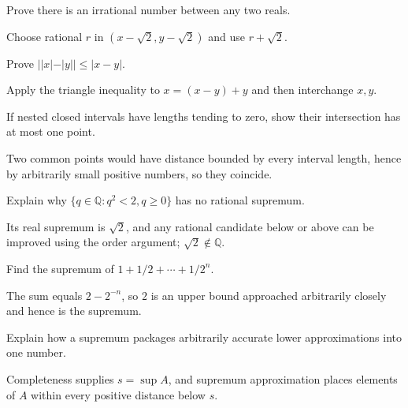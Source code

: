\begin{problem}\label{prob:ii01-problem-07}
Prove there is an irrational number between any two reals.
\end{problem}
\begin{solution}
Choose rational $r$ in $(x-\sqrt2,y-\sqrt2)$ and use $r+\sqrt2$.
\end{solution}

\begin{problem}\label{prob:ii01-problem-08}
Prove $||x|-|y||\le|x-y|$.
\end{problem}
\begin{solution}
Apply the triangle inequality to $x=(x-y)+y$ and then interchange $x,y$.
\end{solution}

\begin{problem}\label{prob:ii01-problem-09}
If nested closed intervals have lengths tending to zero, show their intersection has at most one point.
\end{problem}
\begin{solution}
Two common points would have distance bounded by every interval length, hence by arbitrarily small positive numbers, so they coincide.
\end{solution}

\begin{problem}\label{prob:ii01-problem-10}
Explain why $\{q\in\mathbb Q:q^2<2,q\ge0\}$ has no rational supremum.
\end{problem}
\begin{solution}
Its real supremum is $\sqrt2$, and any rational candidate below or above can be improved using the order argument; $\sqrt2\notin\mathbb Q$.
\end{solution}

\begin{problem}\label{prob:ii01-problem-11}
Find the supremum of $1+1/2+\cdots+1/2^n$.
\end{problem}
\begin{solution}
The sum equals $2-2^{-n}$, so $2$ is an upper bound approached arbitrarily closely and hence is the supremum.
\end{solution}

\begin{problem}\label{prob:ii01-problem-12}
Explain how a supremum packages arbitrarily accurate lower approximations into one number.
\end{problem}
\begin{solution}
Completeness supplies $s=\sup A$, and supremum approximation places elements of $A$ within every positive distance below $s$.
\end{solution}

